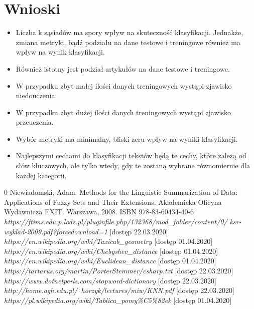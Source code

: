 \documentclass{classrep}
\begin{document}
\newpage
\section{Wnioski}
\begin{itemize}
	\item Liczba k sąsiadów ma spory wpływ na skuteczność klasyfikacji. Jednakże, zmiana metryki, bądź podziału na dane testowe i treningowe również ma wpływ na wynik klasyfikacji.
	\item Również istotny jest podział artykułów na dane testowe i treningowe. 
	\item W przypadku zbyt małej ilości danych treningowych wystąpi zjawisko niedouczenia.
	\item W przypadku zbyt dużej ilości danych treningowych wystąpi zjawisko przeuczenia.
	\item Wybór metryki ma minimalny, bliski zeru wpływ na wyniki klasyfikacji.
	\item Najlepszymi cechami do klasyfikacji tekstów będą te cechy, które zależą od słów kluczowych, ale tylko wtedy, gdy te zostaną wybrane równomiernie dla każdej kategorii.
\end{itemize}


\begin{thebibliography} {0}
 Niewiadomski, Adam. Methods for the Linguistic Summarization of Data: Applications of Fuzzy Sets and Their Extensions. Akademicka Oficyna Wydawnicza EXIT. Warszawa, 2008. ISBN 978-83-60434-40-6
 \textsl{https://ftims.edu.p.lodz.pl/pluginfile.php/132368/mod\_folder/content/0/
ksr-wyklad-2009.pdf?forcedownload=1} [dostęp 22.03.2020]
 \textsl{https://en.wikipedia.org/wiki/Taxicab\_geometry} [dostęp 01.04.2020]
 \textsl{https://en.wikipedia.org/wiki/Chebyshev\_distance} [dostęp 01.04.2020]
 \textsl{https://en.wikipedia.org/wiki/Euclidean\_distance} [dostęp 01.04.2020]
 \textsl{https://tartarus.org/martin/PorterStemmer/csharp.txt} [dostęp 22.03.2020]
 \textsl{https://www.dotnetperls.com/stopword-dictionary} [dostęp 22.03.2020]
 \textsl{http://home.agh.edu.pl/~horzyk/lectures/miw/KNN.pdf} [dostęp 22.03.2020]
 \textsl{https://pl.wikipedia.org/wiki/Tablica\_pomy\%C5\%82ek} [dostęp 01.04.2020]
\end{thebibliography}
\end{document}
